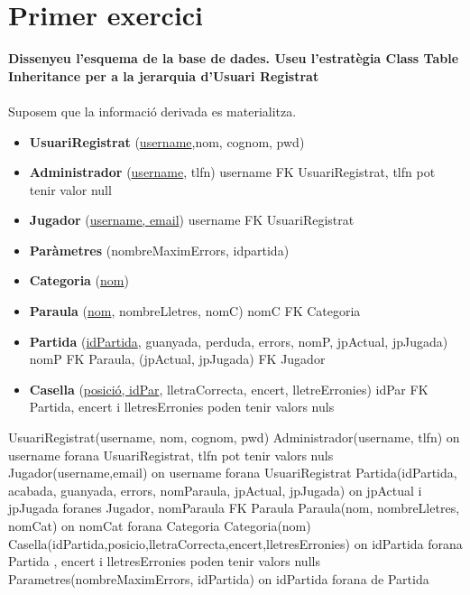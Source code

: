 \section{Primer exercici}

\textbf{Dissenyeu l’esquema de la base de dades. Useu l’estratègia Class Table Inheritance per a la jerarquia d’Usuari Registrat}\\\\
Suposem que la informació derivada es materialitza.

\begin{itemize}
    \item \textbf{UsuariRegistrat} (\underline{username},nom, cognom, pwd) 
    
    \item \textbf{Administrador} (\underline{username}, tlfn) username FK UsuariRegistrat, tlfn pot tenir valor null
    \item \textbf{Jugador} (\underline{username, email}) username FK UsuariRegistrat
    
    \item \textbf{Paràmetres} (nombreMaximErrors, idpartida)
    
    \item \textbf{Categoria} (\underline{nom})
    
    \item \textbf{Paraula} (\underline{nom}, nombreLletres, nomC) nomC FK Categoria
    
    \item \textbf{Partida} (\underline{idPartida}, guanyada, perduda, errors, nomP, jpActual, jpJugada) nomP FK Paraula, (jpActual, jpJugada) FK Jugador
    
    \item \textbf{Casella} (\underline{posició, idPar}, lletraCorrecta, encert, lletreErronies) idPar FK Partida, encert i lletresErronies poden tenir valors nuls
    
\end{itemize}

UsuariRegistrat(username, nom, cognom, pwd)
Administrador(username, tlfn) on username forana UsuariRegistrat, tlfn pot tenir valors nuls
Jugador(username,email) on username forana UsuariRegistrat
Partida(idPartida, acabada, guanyada, errors, nomParaula, jpActual, jpJugada) on jpActual i jpJugada foranes Jugador, nomParaula FK Paraula
Paraula(nom, nombreLletres, nomCat) on nomCat forana Categoria
Categoria(nom)
Casella(idPartida,posicio,lletraCorrecta,encert,lletresErronies) on idPartida forana Partida , encert i lletresErronies poden tenir valors nulls
Parametres(nombreMaximErrors, idPartida) on idPartida forana de Partida